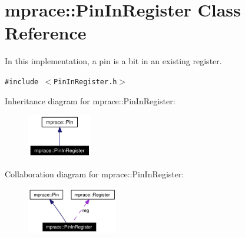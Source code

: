 \hypertarget{classmprace_1_1PinInRegister}{
\section{mprace::Pin\-In\-Register Class Reference}
\label{classmprace_1_1PinInRegister}
}
In this implementation, a pin is a bit in an existing register.  


{\tt \#include $<$Pin\-In\-Register.h$>$}

Inheritance diagram for mprace::Pin\-In\-Register:\begin{figure}[H]
\begin{center}
\leavevmode
\includegraphics[width=80pt]{classmprace_1_1PinInRegister__inherit__graph}
\end{center}
\end{figure}
Collaboration diagram for mprace::Pin\-In\-Register:\begin{figure}[H]
\begin{center}
\leavevmode
\includegraphics[width=112pt]{classmprace_1_1PinInRegister__coll__graph}
\end{center}
\end{figure}
